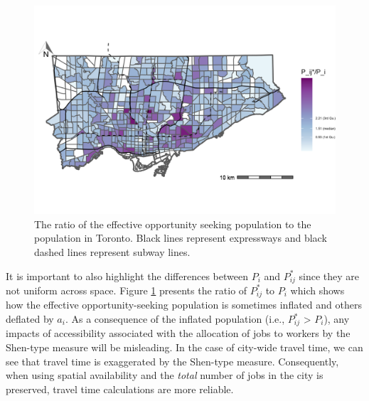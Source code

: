 \documentclass[]{elsarticle} %
\begin{document}
\begin{figure}
\includegraphics[width=1\linewidth]{images/osp_plot_TO} \caption{\label{fig:ratio-OPS-to-pop-plot}  The ratio of the effective opportunity seeking population to the population in Toronto. Black lines represent expressways and black dashed lines represent subway lines.}\label{fig:ratio-OPS-to-pop-plot}
\end{figure}

It is important to also highlight the differences between \(P_i\) and
\(P_{ij}^*\) since they are not uniform across space. Figure
\ref{fig:ratio-OPS-to-pop-plot} presents the ratio of \(P_{ij}^*\) to
\(P_i\) which shows how the effective opportunity-seeking population is
sometimes inflated and others deflated by \(a_i\). As a consequence of
the inflated population (i.e., \(P_{ij}^*\) \textgreater{} \(P_i\)), any
impacts of accessibility associated with the allocation of jobs to
workers by the Shen-type measure will be misleading. In the case of
city-wide travel time, we can see that travel time is exaggerated by the
Shen-type measure. Consequently, when using spatial availability and the
\emph{total} number of jobs in the city is preserved, travel time
calculations are more reliable.

 
  \providecommand{\huxb}[2]{\arrayrulecolor[RGB]{#1}\global\arrayrulewidth=#2pt}
  \providecommand{\huxvb}[2]{\color[RGB]{#1}\vrule width #2pt}
  \providecommand{\huxtpad}[1]{\rule{0pt}{#1}}
  \providecommand{\huxbpad}[1]{\rule[-#1]{0pt}{#1}}
\end{document}
